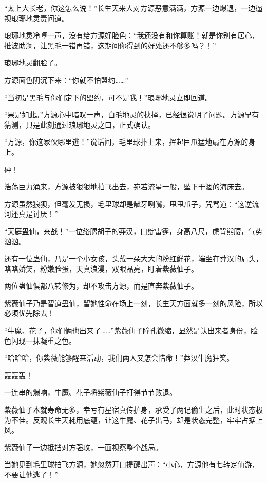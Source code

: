 
\begin{this_body}



“太上大长老，你这怎么说！”长生天来人对方源恶意满满，方源一边爆退，一边逼视琅琊地灵责问道。

琅琊地灵冷哼一声，没有给方源好脸色：“我还没有和你算账！就是你别有居心，推波助澜，让黑毛一错再错，这期间你得到的好处还不够多吗？！”

琅琊地灵翻脸了。

方源面色阴沉下来：“你就不怕盟约……”

“当初是黑毛与你们定下的盟约，可不是我！”琅琊地灵立即回道。

“果是如此。”方源心中暗叹一声，白毛地灵的抉择，已经很说明了问题。方源早有猜测，只是此刻通过琅琊地灵之口，正式确认。

“方源，你这家伙哪里逃！”说话间，毛里球扑上来，挥起巨爪猛地扇在方源的身上。

砰！

浩荡巨力涌来，方源被狠狠地拍飞出去，宛若流星一般，坠下干涸的海床去。

方源虽然狼狈，但毫发无损，毛里球却是龇牙咧嘴，甩甩爪子，咒骂道：“这逆流河还真是讨厌！”

“天庭蛊仙，来战！”一位络腮胡子的莽汉，口绽雷霆，身高八尺，虎背熊腰，气势汹汹。

还有一位蛊仙，乃是一个小女孩，头戴一朵大大的粉红鲜花，端坐在莽汉的肩头，咯咯娇笑，粉嫩脸蛋，天真浪漫，双眼晶亮，盯着紫薇仙子。

两位蛊仙俱都八转修为，却不攻击方源，而是直奔紫薇仙子。

紫薇仙子乃是智道蛊仙，留她性命在场上一刻，长生天方面就多一刻的风险，所以必须优先除去！

“牛魔、花子，你们俩也出来了……”紫薇仙子瞳孔微缩，显然是认出来者身份，脸色闪现一抹凝重之色。

“哈哈哈，你紫薇能够醒来活动，我们两人又怎会惜命！”莽汉牛魔狂笑。

轰轰轰！

一连串的爆响，牛魔、花子将紫薇仙子打得节节败退。

紫薇仙子本就寿命无多，幸亏有星宿真传护身，承受了两记偷生之后，此时状态极为不佳。反观长生天耗用底蕴，让这牛魔、花子出马，却是状态完整，牢牢占据上风。

紫薇仙子一边抵挡对方强攻，一面视察整个战局。

当她见到毛里球拍飞方源，她忽然开口提醒出声：“小心，方源他有七转定仙游，不要让他逃了！”


\end{this_body}
